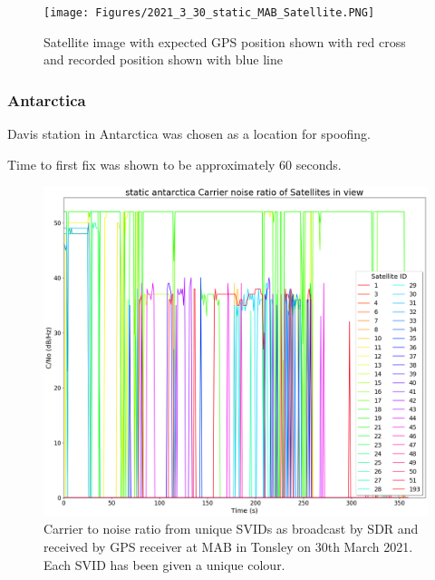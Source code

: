 \begin{figure}[h]
    \begin{centering}
        \texttt{[image: Figures/2021\_3\_30\_static\_MAB\_Satellite.PNG]}
        \caption{Satellite image with expected GPS position shown with red cross and recorded position shown with blue line}
        \label{fig:MABSatelliteImage}
    \end{centering}
\end{figure}

\subsubsection{Antarctica}
Davis station in Antarctica was chosen as a location for spoofing. 

Time to first fix was shown to be approximately 60 seconds.

\begin{figure}[h]
    \begin{centering}
        \includegraphics[width=14cm,keepaspectratio]{Figures/2021_3_30_static_antarctica Carrier noise ratio.png}
        \caption{Carrier to noise ratio from unique SVIDs as broadcast by SDR and received by GPS receiver at MAB in Tonsley on 30th March 2021. Each SVID has been given a unique colour.}
        \label{fig:antarcticaStaticCNo}
    \end{centering}
\end{figure}

